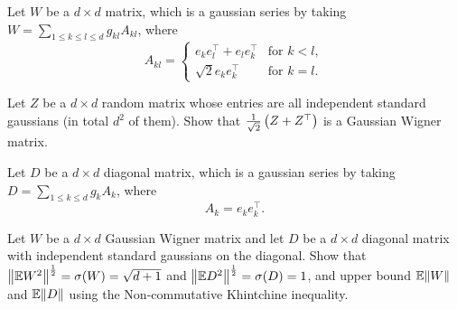 \begin{definition}
    Let $W$ be a $d \times d$ matrix, which is a gaussian series by taking $W = \sum_{1 \leq k \leq l \leq d}g_{kl}A_{kl}$, where
    \begin{equation*}
        A_{kl} = \begin{cases}
            e_ke_l^\top + e_le_k^\top &\text{for }k<l,\\
            \sqrt{2} e_ke_k^\top &\text{for }k=l.
        \end{cases}
    \end{equation*}
\end{definition}


\begin{myexercise}\label{prob:constructing_wigner}
    Let $Z$ be a $d \times d$ random matrix whose entries are all independent standard gaussians (in total $d^2$
of them). Show that $\frac{1}{\sqrt{2}}\left( Z + Z^\top \right)$ is a Gaussian Wigner matrix.
\end{myexercise}


\begin{definition}
    Let $D$ be a $d \times d$ diagonal matrix, which is a gaussian series by taking $D = \sum_{1 \leq k \leq d}g_{k}A_{k}$, where
    \begin{equation*}
        A_{k} = e_ke_k^\top.
    \end{equation*}
\end{definition}


\begin{myexercise}\label{prob:computing_sigma}
    Let $W$ be a $d \times d$ Gaussian Wigner matrix and let $D$ be a $d \times d$ diagonal matrix with independent standard gaussians on the diagonal. Show that ${\left\lVert{\mathbb{E}W^2}\right\rVert}^{\frac12} = \sigma(W) = \sqrt{d+1}$ and ${\left\lVert{\mathbb{E}D^2}\right\rVert}^{\frac12} = \sigma(D) = 1$, and upper bound $\mathbb{E}{\left\lVert{W}\right\rVert}$ and $\mathbb{E}{\left\lVert{D}\right\rVert}$ using the Non-commutative Khintchine inequality.
\end{myexercise}

